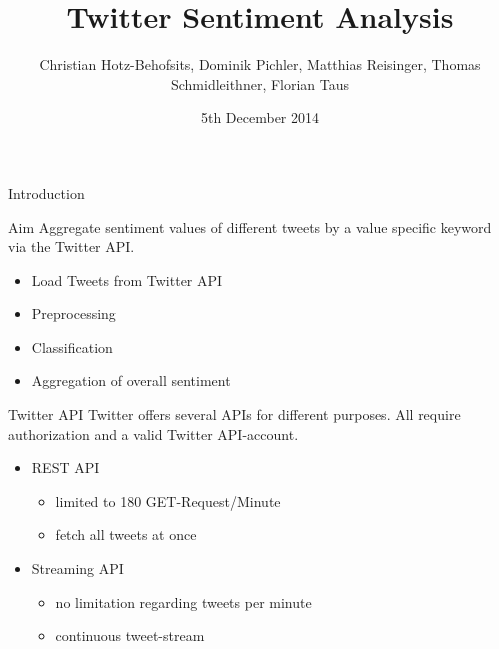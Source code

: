 \documentclass{beamer}
\title[Twitter Sentiment Analysis]{Twitter Sentiment Analysis}
\author{Christian Hotz-Behofsits, Dominik Pichler, Matthias Reisinger, Thomas Schmidleithner, Florian Taus}
\institute{Advanced Internet Computing}
\date{5th December 2014}
\begin{document}
\begin{frame}
  \titlepage
\end{frame}
\begin{frame}{Introduction}
\begin{block}{Aim}
Aggregate sentiment values of different tweets by a value specific keyword via the Twitter API.
\end{block}
\begin{itemize}
   \item Load Tweets from Twitter API
   \item Preprocessing
   \item Classification
   \item Aggregation of overall sentiment
\end{itemize}
\end{frame}

\begin{frame}{Twitter API}
Twitter offers several APIs for different purposes. All require authorization and a valid Twitter API-account.

\begin{itemize}
	\item REST API
	\begin{itemize}
    	\item limited to 180 GET-Request/Minute
        \item fetch all tweets at once
    \end{itemize}
    \item Streaming API
	\begin{itemize}
    	\item no limitation regarding tweets per minute
        \item continuous tweet-stream
    \end{itemize}
\end{itemize}
\end{frame}

\end{document}
